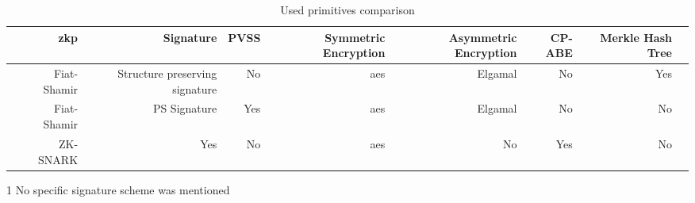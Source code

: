 \begin{table*}[h!]\centering
\caption{Used primitives comparison}\label{tab:used-primitives-comparison}
\scriptsize
\begin{threeparttable}
\begin{tabular}{lrrrrrrrr}
\toprule %
&\ac{zkp} &Signature &PVSS &Symmetric Encryption &Asymmetric Encryption &CP-ABE &Merkle Hash Tree \\\midrule
\cite{xue2023blockchain} &Fiat-Shamir &Structure preserving signature &No &\ac{aes} &Elgamal &No &Yes \\
\cite{liu2022blockchain} &Fiat-Shamir &PS Signature &Yes &\ac{aes} &Elgamal &No &No \\
\cite{alsharif2020blockchain} &ZK-SNARK &Yes\tnote{1} &No &\ac{aes} &No &Yes &No \\
\bottomrule
\end{tabular}
\begin{tablenotes}
    \item[1] No specific signature scheme was mentioned
\end{tablenotes}
\end{threeparttable}
\end{table*}

